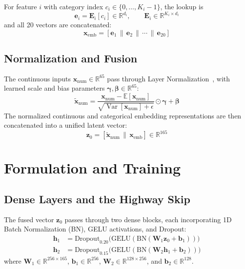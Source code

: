 \documentclass[conference,10pt,letterpaper]{IEEEtran}
\begin{document}
For feature $i$ with category index $c_i \in \{0, \dots, K_i - 1\}$, the lookup is
\begin{equation}
\mathbf{e}_i = \mathbf{E}_i[c_i] \in \mathbb{R}^{d_i}, \qquad \mathbf{E}_i \in \mathbb{R}^{K_i \times d_i}
\end{equation}
and all 20 vectors are concatenated:
\begin{equation}
\mathbf{x}_{\text{emb}} = \left[\mathbf{e}_1 \,\|\, \mathbf{e}_2 \,\|\, \cdots \,\|\, \mathbf{e}_{20}\right]
\end{equation}

\subsection{Normalization and Fusion}
The continuous inputs $\mathbf{x}_{\text{num}} \in \mathbb{R}^{65}$ pass through Layer Normalization~\cite{ba2016layer}, with learned scale and bias parameters $\boldsymbol{\gamma}, \boldsymbol{\beta} \in \mathbb{R}^{65}$:
\begin{equation}
\tilde{\mathbf{x}}_{\text{num}} = \frac{\mathbf{x}_{\text{num}} - \mathbb{E}[\mathbf{x}_{\text{num}}]}{\sqrt{\operatorname{Var}[\mathbf{x}_{\text{num}}] + \epsilon}} \odot \boldsymbol{\gamma} + \boldsymbol{\beta}
\end{equation}
The normalized continuous and categorical embedding representations are then concatenated into a unified latent vector:
\begin{equation}
\mathbf{z}_0 = \left[\tilde{\mathbf{x}}_{\text{num}} \,\|\, \mathbf{x}_{\text{emb}}\right] \in \mathbb{R}^{165}
\end{equation}

\section{Formulation and Training}

\subsection{Dense Layers and the Highway Skip}
The fused vector $\mathbf{z}_0$ passes through two dense blocks, each incorporating 1D Batch Normalization (BN), GELU activations, and Dropout:
\begin{align}
\mathbf{h}_1 &= \text{Dropout}_{0.20}\big(\text{GELU}(\text{BN}(\mathbf{W}_1 \mathbf{z}_0 + \mathbf{b}_1))\big) \\
\mathbf{h}_2 &= \text{Dropout}_{0.15}\big(\text{GELU}(\text{BN}(\mathbf{W}_2 \mathbf{h}_1 + \mathbf{b}_2))\big)
\end{align}
where $\mathbf{W}_1 \in \mathbb{R}^{256 \times 165}$, $\mathbf{b}_1 \in \mathbb{R}^{256}$, $\mathbf{W}_2 \in \mathbb{R}^{128 \times 256}$, and $\mathbf{b}_2 \in \mathbb{R}^{128}$.
\end{document}
